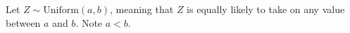 \documentclass[12pt]{exam}
\begin{document}
\begin{questions}
\question
Let $Z \sim \text{Uniform}(a, b)$, meaning that $Z$ is equally likely to take on any value between $a$ and $b$.
Note $a < b$.



\end{questions}
\end{document}
